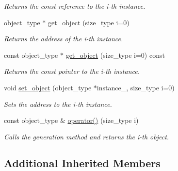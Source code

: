 \begin{DoxyCompactItemize}
\begin{DoxyCompactList}\small\item\em Returns the const reference to the i-\/th instance. \end{DoxyCompactList}\item 
\hypertarget{a00367_a281a6a2d3535dda27cac5b34e3c5949a}{object\-\_\-type $\ast$ \hyperlink{a00367_a281a6a2d3535dda27cac5b34e3c5949a}{get\-\_\-object} (size\-\_\-type i=0)}\label{a00367_a281a6a2d3535dda27cac5b34e3c5949a}

\begin{DoxyCompactList}\small\item\em Returns the address of the i-\/th instance. \end{DoxyCompactList}\item 
\hypertarget{a00367_aa00cd5099ade15d826bbffefbb9983a5}{const object\-\_\-type $\ast$ \hyperlink{a00367_aa00cd5099ade15d826bbffefbb9983a5}{get\-\_\-object} (size\-\_\-type i=0) const }\label{a00367_aa00cd5099ade15d826bbffefbb9983a5}

\begin{DoxyCompactList}\small\item\em Returns the const pointer to the i-\/th instance. \end{DoxyCompactList}\item 
\hypertarget{a00367_a5ccedce10a1eac070db1f182e295836d}{void \hyperlink{a00367_a5ccedce10a1eac070db1f182e295836d}{set\-\_\-object} (object\-\_\-type $\ast$instance\-\_\-, size\-\_\-type i=0)}\label{a00367_a5ccedce10a1eac070db1f182e295836d}

\begin{DoxyCompactList}\small\item\em Sets the address to the i-\/th instance. \end{DoxyCompactList}\item 
\hypertarget{a00367_acb98e53979676e20b584263efc6bc26a}{const object\-\_\-type \& \hyperlink{a00367_acb98e53979676e20b584263efc6bc26a}{operator()} (size\-\_\-type i)}\label{a00367_acb98e53979676e20b584263efc6bc26a}

\begin{DoxyCompactList}\small\item\em Calls the generation method and returns the i-\/th object. \end{DoxyCompactList}\end{DoxyCompactItemize}
\subsection*{Additional Inherited Members}



